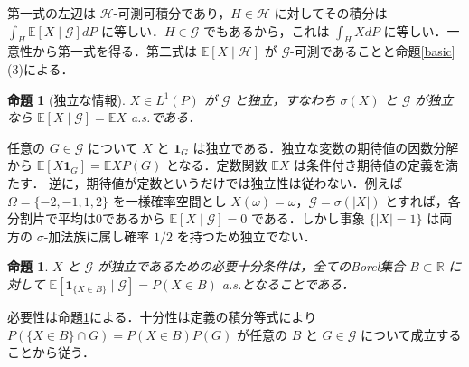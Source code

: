 \documentclass[a5paper,10pt,onecolumn]{jsarticle}
\makeatletter
\theoremstyle{mathnotetheorem}
\newtheorem{proposition}[theorem]{命題}
\renewcommand{\proofname}{証明}
\renewenvironment{proof}[1][\proofname]{%
  \par\pushQED{\qed}\normalfont\topsep4\p@\@plus2\p@\relax
  \trivlist\item[\hskip\labelsep\bfseries #1]\ignorespaces
}{\popQED\endtrivlist\@endpefalse}
\newcommand{\R}{\mathbb{R}}
\newcommand{\G}{\mathcal G}
\newcommand{\E}{\mathbb E}
\newcommand{\1}{\mathbf{1}}
\makeatother
\begin{document}
\begin{proof}
第一式の左辺は $\mathcal H$-可測可積分であり，$H\in\mathcal H$ に対してその積分は $\int_H\E[X\mid\G]dP$ に等しい．$H\in\G$ でもあるから，これは $\int_H XdP$ に等しい．一意性から第一式を得る．第二式は $\E[X\mid\mathcal H]$ が $\G$-可測であることと命題\ref{basic}(3)による．
\end{proof}
\begin{proposition}[独立な情報]\label{ind}
$X\in L^1(P)$ が $\G$ と独立，すなわち $\sigma(X)$ と $\G$ が独立なら $\E[X\mid\G]=\E X$ a.s.である．
\end{proposition}
\begin{proof}
任意の $G\in\G$ について $X$ と $\1_G$ は独立である．独立な変数の期待値の因数分解から $\E[X\1_G]=\E X P(G)$ となる．定数関数 $\E X$ は条件付き期待値の定義を満たす．
\end{proof}
逆に，期待値が定数というだけでは独立性は従わない．例えば $\Omega=\{-2,-1,1,2\}$ を一様確率空間とし $X(\omega)=\omega$，$\G=\sigma(|X|)$ とすれば，各分割片で平均は0であるから $\E[X\mid\G]=0$ である．しかし事象 $\{|X|=1\}$ は両方の $\sigma$-加法族に属し確率 $1/2$ を持つため独立でない．
\begin{proposition}
$X$ と $\G$ が独立であるための必要十分条件は，全てのBorel集合 $B\subset\R$ に対して $\E[\1_{\{X\in B\}}\mid\G]=P(X\in B)$ a.s.となることである．
\end{proposition}
\begin{proof}
必要性は命題\ref{ind}による．十分性は定義の積分等式により $P(\{X\in B\}\cap G)=P(X\in B)P(G)$ が任意の $B$ と $G\in\G$ について成立することから従う．
\end{proof}
\end{document}
